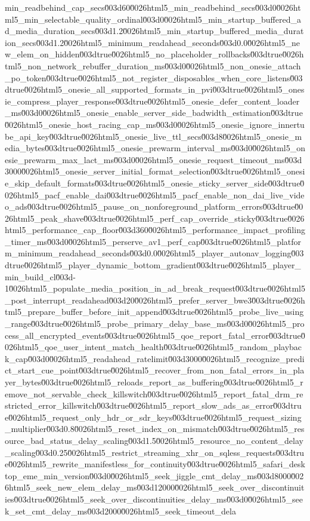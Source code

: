 {min_readbehind_cap_secs\u003d60\u0026html5_min_readbehind_secs\u003d0\u0026html5_min_selectable_quality_ordinal\u003d0\u0026html5_min_startup_buffered_ad_media_duration_secs\u003d1.2\u0026html5_min_startup_buffered_media_duration_secs\u003d1.2\u0026html5_minimum_readahead_seconds\u003d0.0\u0026html5_new_elem_on_hidden\u003dtrue\u0026html5_no_placeholder_rollbacks\u003dtrue\u0026html5_non_network_rebuffer_duration_ms\u003d0\u0026html5_non_onesie_attach_po_token\u003dtrue\u0026html5_not_register_disposables_when_core_listens\u003dtrue\u0026html5_onesie_all_supported_formats_in_pvi\u003dtrue\u0026html5_onesie_compress_player_response\u003dtrue\u0026html5_onesie_defer_content_loader_ms\u003d0\u0026html5_onesie_enable_server_side_badwidth_estimation\u003dtrue\u0026html5_onesie_host_racing_cap_ms\u003d0\u0026html5_onesie_ignore_innertube_api_key\u003dtrue\u0026html5_onesie_live_ttl_secs\u003d8\u0026html5_onesie_media_bytes\u003dtrue\u0026html5_onesie_prewarm_interval_ms\u003d0\u0026html5_onesie_prewarm_max_lact_ms\u003d0\u0026html5_onesie_request_timeout_ms\u003d3000\u0026html5_onesie_server_initial_format_selection\u003dtrue\u0026html5_onesie_skip_default_formats\u003dtrue\u0026html5_onesie_sticky_server_side\u003dtrue\u0026html5_pacf_enable_dai\u003dtrue\u0026html5_pacf_enable_non_dai_live_video_ads\u003dtrue\u0026html5_pause_on_nonforeground_platform_errors\u003dtrue\u0026html5_peak_shave\u003dtrue\u0026html5_perf_cap_override_sticky\u003dtrue\u0026html5_performance_cap_floor\u003d360\u0026html5_performance_impact_profiling_timer_ms\u003d0\u0026html5_perserve_av1_perf_cap\u003dtrue\u0026html5_platform_minimum_readahead_seconds\u003d0.0\u0026html5_player_autonav_logging\u003dtrue\u0026html5_player_dynamic_bottom_gradient\u003dtrue\u0026html5_player_min_build_cl\u003d-1\u0026html5_populate_media_position_in_ad_break_request\u003dtrue\u0026html5_post_interrupt_readahead\u003d20\u0026html5_prefer_server_bwe3\u003dtrue\u0026html5_prepare_buffer_before_init_append\u003dtrue\u0026html5_probe_live_using_range\u003dtrue\u0026html5_probe_primary_delay_base_ms\u003d0\u0026html5_process_all_encrypted_events\u003dtrue\u0026html5_qoe_report_fatal_error\u003dtrue\u0026html5_qoe_user_intent_match_health\u003dtrue\u0026html5_random_playback_cap\u003d0\u0026html5_readahead_ratelimit\u003d3000\u0026html5_recognize_predict_start_cue_point\u003dtrue\u0026html5_recover_from_non_fatal_errors_in_player_bytes\u003dtrue\u0026html5_reloads_report_as_buffering\u003dtrue\u0026html5_remove_not_servable_check_killswitch\u003dtrue\u0026html5_report_fatal_drm_restricted_error_killswitch\u003dtrue\u0026html5_report_slow_ads_as_error\u003dtrue\u0026html5_request_only_hdr_or_sdr_keys\u003dtrue\u0026html5_request_sizing_multiplier\u003d0.8\u0026html5_reset_index_on_mismatch\u003dtrue\u0026html5_resource_bad_status_delay_scaling\u003d1.5\u0026html5_resource_no_content_delay_scaling\u003d0.25\u0026html5_restrict_streaming_xhr_on_sqless_requests\u003dtrue\u0026html5_rewrite_manifestless_for_continuity\u003dtrue\u0026html5_safari_desktop_eme_min_version\u003d0\u0026html5_seek_jiggle_cmt_delay_ms\u003d8000\u0026html5_seek_new_elem_delay_ms\u003d12000\u0026html5_seek_over_discontinuities\u003dtrue\u0026html5_seek_over_discontinuities_delay_ms\u003d0\u0026html5_seek_set_cmt_delay_ms\u003d2000\u0026html5_seek_timeout_dela}
